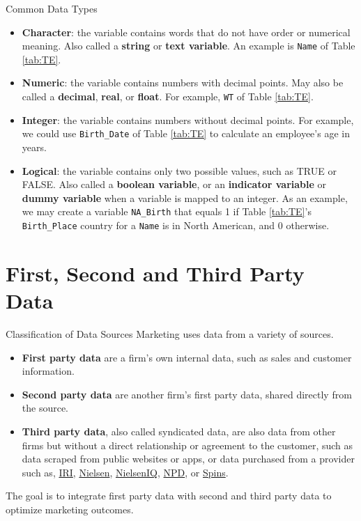 \documentclass[pdf]{beamer}
\newcommand{\empr}[1]{{\color{franklinblue}\textbf{#1}}}
\theoremstyle{remark}
\theoremstyle{definition}
\begin{document}
\begin{frame}[t]{Common Data Types}
\small
\begin{itemize}
\item \empr{Character}: the variable contains words that do not have order or numerical meaning.  Also called a \empr{string} or \empr{text variable}.  An example is \texttt{Name} of Table \ref{tab:TE}.
\item \empr{Numeric}: the variable contains numbers with decimal points.  May also be called a \empr{decimal}, \empr{real}, or \empr{float}. For example, \texttt{WT} of Table \ref{tab:TE}.
\item \empr{Integer}: the variable contains numbers without decimal points.  For example, we could use \texttt{Birth\_Date} of Table \ref{tab:TE}  to calculate an employee's age in years.
\item \empr{Logical}: the variable contains only two possible values, such as TRUE or FALSE. Also called a \empr{boolean variable}, or an \empr{indicator variable} or \empr{dummy variable} when a variable is mapped to an integer.  As an example, we may create a variable \texttt{NA\_Birth} that equals 1 if Table \ref{tab:TE}'s \texttt{Birth\_Place} country for a \texttt{Name} is in North American, and 0 otherwise.
\end{itemize}
\end{frame}

\section{First, Second and Third Party Data}

\begin{frame}[t]{Classification of Data Sources}
Marketing uses data from a variety of sources. \\
\vspace{1.5ex} 
\begin{itemize}
\item \empr{First party data} are a firm's own internal data, such as sales and customer information.
\item \empr{Second party data} are another firm's first party data, shared directly from the source. 
\item \empr{Third party data}, also called syndicated data, are also data from other firms but without a direct relationship or agreement to the customer, such as data scraped from public websites or apps, or data purchased from a provider such as, \href{https://www.iriworldwide.com/en-us}{IRI}, \href{https://www.nielsen.com/}{Nielsen}, \href{https://nielseniq.com/global/en/}{NielsenIQ}, \href{https://www.npd.com/}{NPD}, or \href{https://www.spins.com/}{Spins}.
\end{itemize}
\vspace{0.0ex}
\normalsize
The goal is to integrate first party data with second and third party data to optimize marketing outcomes. \\
\vspace{1.5ex}
\end{frame}
\end{document}
